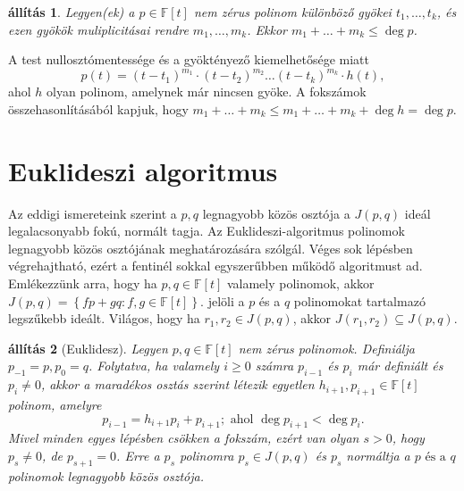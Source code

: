 \documentclass[9pt,showtrims]{memoir}
\makeatletter
\renewenvironment{proof}[1][\proofname]
    {\par\pushQED{\qed}%
    \normalfont \topsep6\p@\@plus6\p@\relax
    \trivlist
    \item[\hskip\labelsep
        \itshape
    #1\@addpunct{:}]\ignorespaces}
    {\popQED\endtrivlist\@endpefalse}
\theoremstyle{plain}
\newtheorem{proposition}{állítás}[chapter]
\theoremstyle{remark}
\theoremstyle{definition}
\renewcommand{\mathbf}{\mathbb}
\makeatother
\begin{document}
\begin{proposition}
    Legyen(ek) a $p\in\mathbf{F}\left[ t \right]$ nem zérus polinom különböző gyökei $t_1,\dots,t_k$,
    és ezen gyökök muliplicitásai rendre $m_1,\dots,m_k$.
    Ekkor $m_1+\dots+m_k\leq\deg p$.
\end{proposition}
\begin{proof}
    A test nullosztómentessége és a gyöktényező kiemelhetősége miatt 
    \[
    p\left( t \right)=
    \left( t-t_1 \right)^{m_1}\cdot\left( t-t_2 \right)^{m_2}\dots\left( t-t_k \right)^{m_k}\cdot 
    h\left( t \right),
    \]
    ahol $h$ olyan polinom, amelynek már nincsen gyöke.
    A fokszámok összehasonlításából kapjuk, hogy
    $m_1+\dots+m_k\leq m_1+\dots+m_k+\deg h=\deg p$.
\end{proof}

\section{Euklideszi algoritmus}
Az eddigi ismereteink szerint a $p,q$ legnagyobb közös osztója a $J\left( p,q \right)$ ideál legalacsonyabb 
fokú, normált tagja. 
Az Euklideszi-algoritmus polinomok legnagyobb közös osztójának meghatározására szólgál.
Véges sok lépésben végrehajtható, ezért a fentinél sokkal egyszerűbben működő algoritmust ad.
Emlékezzünk arra, hogy ha $p,q\in\mathbf{F}\left[ t \right]$ valamely polinomok, akkor
    \(
        J\left( p,q \right)=\left\{ fp+gq:f,g\in\mathbf{F}\left[ t \right] \right\}.
    \)
jelöli a $p$ és a $q$ polinomokat tartalmazó legszűkebb ideált.
Világos, hogy ha $r_1,r_2\in J\left( p,q \right)$, akkor 
$J\left( r_1,r_2 \right)\subseteq J\left( p,q \right)$.
\begin{proposition}[Euklidesz]
    Legyen $p,q\in\mathbb{F}\left[ t \right]$ nem zérus polinomok.
    Definiálja $p_{-1}=p,p_{0}=q$. 
    Folytatva, ha valamely $i\geq 0$ számra $p_{i-1}$ és $p_i$ már definiált és $p_i\neq 0$, 
    akkor a maradékos osztás szerint létezik egyetlen $h_{i+1},p_{i+1}\in\mathbb{F}\left[ t \right]$ polinom,
    amelyre 
    \[
        p_{i-1}=h_{i+1}p_i+p_{i+1};
        \text{ ahol }
        \deg p_{i+1}<\deg p_i.\tag{\dag}
    \]
    Mivel minden egyes lépésben csökken a fokszám,
    ezért van olyan $s>0$, hogy $p_s\neq 0$, de $p_{s+1}=0$.
    Erre a $p_s$ polinomra $p_s\in J\left( p,q \right)$ és
    $p_s$ normáltja a $p\text{ és a }q$ polinomok legnagyobb közös osztója.
\end{proposition}
\end{document}

